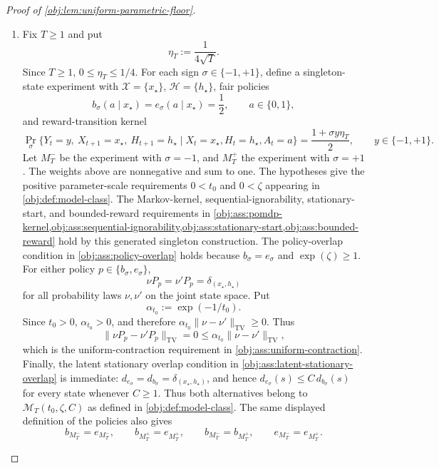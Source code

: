 \documentclass[11pt]{article}
\begin{document}
\begin{proof}[Proof of \cref{obj:lem:uniform-parametric-floor}]
\begin{enumerate}
\item Fix \(T\ge 1\) and put
\[
\eta_T:=\frac{1}{4\sqrt T}.
\]
Since \(T\ge1\), \(0\le \eta_T\le 1/4\).  For each sign
\(\sigma\in\{-1,+1\}\), define a singleton-state experiment with
\(\mathcal X=\{x_\star\}\), \(\mathcal H=\{h_\star\}\), fair policies
\[
b_\sigma(a\mid x_\star)=e_\sigma(a\mid x_\star)=\frac12,
\qquad a\in\{0,1\},
\]
and reward-transition kernel
\[
\Pr_\sigma\{Y_t=y,\ X_{t+1}=x_\star,\ H_{t+1}=h_\star
       \mid X_t=x_\star,H_t=h_\star,A_t=a\}
=
\frac{1+\sigma y\eta_T}{2},
\qquad y\in\{-1,+1\}.
\]
Let \(M_T^{-}\) be the experiment with \(\sigma=-1\), and \(M_T^{+}\) the
experiment with \(\sigma=+1\).  The weights above are nonnegative and sum to
one.  The hypotheses give the positive parameter-scale requirements
\(0<t_0\) and \(0<\zeta\) appearing in \cref{obj:def:model-class}.  The
Markov-kernel, sequential-ignorability, stationary-start, and bounded-reward
requirements in
\cref{obj:ass:pomdp-kernel,obj:ass:sequential-ignorability,obj:ass:stationary-start,obj:ass:bounded-reward}
hold by this generated singleton construction.  The policy-overlap condition
in \cref{obj:ass:policy-overlap} holds because \(b_\sigma=e_\sigma\) and
\(\exp(\zeta)\ge1\).  For either policy \(p\in\{b_\sigma,e_\sigma\}\),
\[
\nu P_p=\nu'P_p=\delta_{(x_\star,h_\star)}
\]
for all probability laws \(\nu,\nu'\) on the joint state space.  Put
\[
\alpha_{t_0}:=\exp(-1/t_0).
\]
Since \(t_0>0\), \(\alpha_{t_0}>0\), and therefore
\(\alpha_{t_0}\|\nu-\nu'\|_{\mathrm{TV}}\ge0\).  Thus
\[
\|\nu P_p-\nu'P_p\|_{\mathrm{TV}}
=0
\le
\alpha_{t_0}\|\nu-\nu'\|_{\mathrm{TV}},
\]
which is the uniform-contraction requirement in
\cref{obj:ass:uniform-contraction}.  Finally, the latent stationary overlap condition in
\cref{obj:ass:latent-stationary-overlap} is immediate:
\(d_{e_\sigma}=d_{b_\sigma}=\delta_{(x_\star,h_\star)}\), and hence
\(d_{e_\sigma}(s)\le C\,d_{b_\sigma}(s)\) for every state whenever \(C\ge1\).
Thus both alternatives belong to \(\mathcal M_T(t_0,\zeta,C)\) as defined in
\cref{obj:def:model-class}.  The same displayed definition of the policies
also gives
\[
b_{M_T^-}=e_{M_T^-},\qquad
b_{M_T^+}=e_{M_T^+},\qquad
b_{M_T^-}=b_{M_T^+},\qquad
e_{M_T^-}=e_{M_T^+}.
\]


\end{enumerate}
\end{proof}
\end{document}

